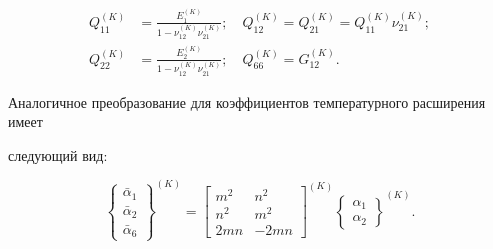 \begin{equation}

\label{bitkina:eq4}

\begin{aligned}

Q_{11}^{(K)} &=\frac{E_1^{(K)}}{1-\nu _{12}^{(K)} \nu _{21}^{(K)}

};\quad Q_{12}^{(K)} =Q_{21}^{(K)} =Q_{11}^{(K)} \nu _{21}^{(K)} ; \\

Q_{22}^{(K)} &=\frac{E_2^{(K)} }{1-\nu _{12}^{(K)} \nu _{21}^{(K)}

};\quad Q_{66}^{(K)} =G_{12}^{(K)}.

\end{aligned}

\end{equation}



Аналогичное преобразование для коэффициентов температурного расширения имеет

следующий вид:

\begin{equation}

\label{bitkina:eq5}

\left\{ \begin{array}{c}

\bar \alpha  _1   \\

\bar \alpha  _2   \\

\bar \alpha  _6

\end{array}\right\}^{(K)}= \begin{bmatrix}

m^2   &   n^2   \\

n^2   &   m^2   \\

2mn   &  -2mn

\end{bmatrix}^{(K)} \left\{ \begin{array}{c}

\alpha _1    \\

\alpha _2

\end{array} \right\}^{(K)}.

\end{equation}



